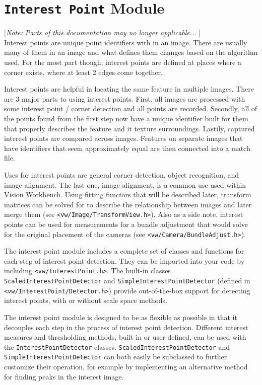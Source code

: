 \chapter{{\tt Interest Point} Module}\label{ch:interestpoint-module}

[{\em Note: Parts of this documentation may no longer applicable... }]
$$
$$
Interest points are unique point identifiers with in an image. There
are usually many of them in an image and what defines them changes
based on the algorithm used. For the most part though, interest points
are defined at places where a corner exists, where at least 2 edges
come together.

Interest points are helpful in locating the same feature in multiple
images. There are 3 major parts to using interest points. First, all
images are processed with some interest point / corner detection and
all points are recorded. Secondly, all of the points found from the
first step now have a unique identifier built for them that properly
describes the feature and it texture surroundings. Lastily, captured
interest points are compared across images. Features on separate
images that have identifiers that seem approximately equal are then
connected into a match file.

Uses for interest points are general corner detection, object
recognition, and image alignment. The last one, image alignment, is a
common use used within Vision Workbench. Using fitting functors that
will be described later, transform matrices can be solved for to
describe the relationship between images and later merge them (see
{\tt <vw/Image/TransformView.h>}). Also as a side note, interest points
can be used for measurements for a bundle adjustment that would solve
for the original placement of the cameras (see
{\tt <vw/Camera/BundleAdjust.h>}).

The interest point module includes a complete set of classes and
functions for each step of interest point detection. They can be
imported into your code by including {\tt <vw/InterestPoint.h>}. The
built-in classes {\tt ScaledInterestPointDetector} and
{\tt SimpleInterestPointDetector} (defined in {\tt
  <vw/InterestPoint/Detector.h>}) provide out-of-the-box support for
detecting interest points, with or without scale space methods.

The interest point module is designed to be as flexible as possible in
that it decouples each step in the process of interest point
detection. Different interest measures and thresholding methods,
built-in or user-defined, can be used with the 
{\tt InterestPointDetector} classes. {\tt ScaledInterestPointDetector}
and {\tt SimpleInterestPointDetector} can both easily be subclassed to
further customize their operation, for example by implementing an
alternative method for finding peaks in the interest image.

